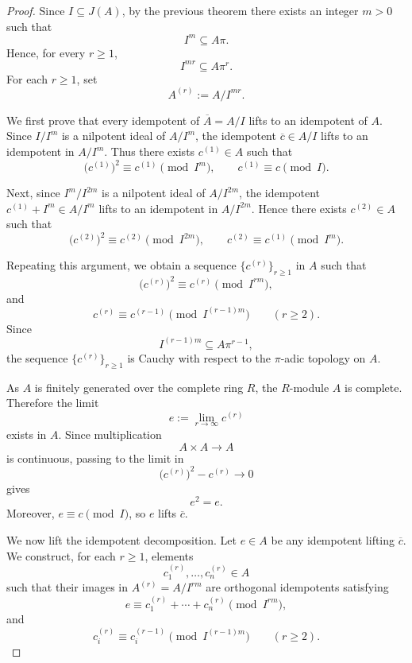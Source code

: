\begin{proof}
    Since \(I\subseteq J(A)\), by the previous theorem there exists an integer
    \(m>0\) such that
    \[
        I^m\subseteq A\pi.
    \]
    Hence, for every \(r\geq 1\),
    \[
        I^{mr}\subseteq A\pi^r.
    \]
    For each \(r\geq 1\), set
    \[
        A^{(r)}:=A/I^{mr}.
    \]

    We first prove that every idempotent of \(\overline{A}=A/I\) lifts to an
    idempotent of \(A\). Since \(I/I^m\) is a nilpotent ideal of \(A/I^m\), the
    idempotent \(\overline{c}\in A/I\) lifts to an idempotent in \(A/I^m\). Thus
    there exists \(c^{(1)}\in A\) such that
    \[
        \bigl(c^{(1)}\bigr)^2\equiv c^{(1)} \pmod{I^m},
        \qquad
        c^{(1)}\equiv c \pmod I.
    \]

    Next, since \(I^m/I^{2m}\) is a nilpotent ideal of \(A/I^{2m}\), the idempotent
    \(c^{(1)}+I^m\in A/I^m\) lifts to an idempotent in \(A/I^{2m}\). Hence there
    exists \(c^{(2)}\in A\) such that
    \[
        \bigl(c^{(2)}\bigr)^2\equiv c^{(2)} \pmod{I^{2m}},
        \qquad
        c^{(2)}\equiv c^{(1)} \pmod{I^m}.
    \]

    Repeating this argument, we obtain a sequence \(\{c^{(r)}\}_{r\geq 1}\) in \(A\)
    such that
    \[
        \bigl(c^{(r)}\bigr)^2\equiv c^{(r)} \pmod{I^{rm}},
    \]
    and
    \[
        c^{(r)}\equiv c^{(r-1)} \pmod{I^{(r-1)m}}
        \qquad (r\geq 2).
    \]
    Since
    \[
        I^{(r-1)m}\subseteq A\pi^{r-1},
    \]
    the sequence \(\{c^{(r)}\}_{r\geq 1}\) is Cauchy with respect to the
    \(\pi\)-adic topology on \(A\).

    As \(A\) is finitely generated over the complete ring \(R\), the \(R\)-module
    \(A\) is complete. Therefore the limit
    \[
        e:=\lim_{r\to\infty} c^{(r)}
    \]
    exists in \(A\). Since multiplication
    \[
        A\times A\longrightarrow A
    \]
    is continuous, passing to the limit in
    \[
        \bigl(c^{(r)}\bigr)^2-c^{(r)}\longrightarrow 0
    \]
    gives
    \[
        e^2=e.
    \]
    Moreover, \(e\equiv c\pmod I\), so \(e\) lifts \(\overline{c}\).

    We now lift the idempotent decomposition. Let \(e\in A\) be any idempotent lifting
    \(\overline{c}\). We construct, for each \(r\geq 1\), elements
    \[
        c_1^{(r)},\dots,c_n^{(r)}\in A
    \]
    such that their images in \(A^{(r)}=A/I^{rm}\) are orthogonal idempotents satisfying
    \[
        e\equiv c_1^{(r)}+\cdots+c_n^{(r)}
        \pmod{I^{rm}},
    \]
    and
    \[
        c_i^{(r)}\equiv c_i^{(r-1)}
        \pmod{I^{(r-1)m}}
        \qquad (r\geq 2).
    \]


\end{proof}
